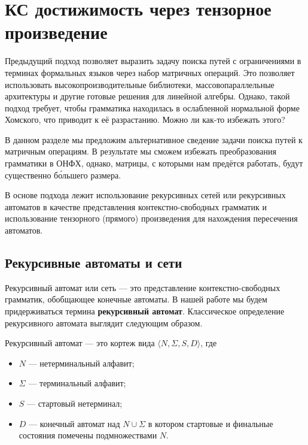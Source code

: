 \chapter{КС достижимость через тензорное произведение}

Предыдущий подход позволяет выразить задачу поиска путей с ограничениями в терминах формальных языков через набор матричных операций.
Это позволяет использовать высокопроизводительные библиотеки, массовопараллельные архитектуры и другие готовые решения для линейной алгебры.
Однако, такой подход требует, чтобы грамматика находилась в ослабленной нормальной форме Хомского, что приводит к её разрастанию.
Можно ли как-то избежать этого?

В данном разделе мы предложим альтернативное сведение задачи поиска путей к матричным операциям.
В результате мы сможем избежать преобразования грамматики в ОНФХ, однако, матрицы, с которыми нам предётся работать, будут существенно б\'{о}льшего размера.

В основе подхода лежит использование рекурсивных сетей или рекурсивных автоматов в качестве представления контекстно-свободных грамматик и использование тензорного (прямого) произведения для нахождения пересечения автоматов.

\section{Рекурсивные автоматы и сети}

Рекурсивный автомат или сеть --- это представление контекстно-свободных грамматик, обобщающее конечные автоматы.
В нашей работе мы будем придерживаться термина \textbf{рекурсивный автомат}. 
Классическое определение рекурсивного автомата выглядит следующим образом.

\begin{definition}
Рекурсивный автомат --- это кортеж вида $\langle N, \Sigma, S, D \rangle$, где
\begin{itemize}
\item $N$ --- нетерминальный алфавит;
\item $\Sigma$ --- терминальный алфавит;
\item $S$ --- стартовый нетерминал;
\item $D$ --- конечный автомат над $N \cup \Sigma$ в котором стартовые и финальные состояния помечены подмножествами $N$.
\end{itemize}
\end{definition}



